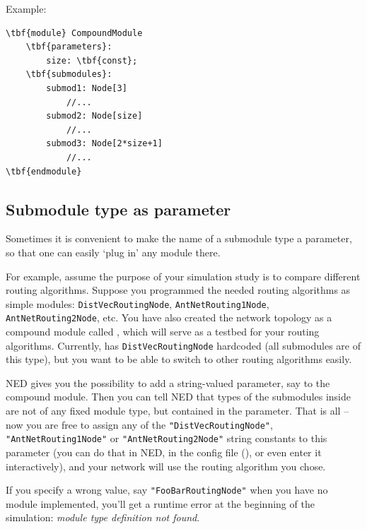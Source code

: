 Example:

\begin{Verbatim}[commandchars=\\\{\}]
\tbf{module} CompoundModule
    \tbf{parameters}:
        size: \tbf{const};
    \tbf{submodules}:
        submod1: Node[3]
            //...
        submod2: Node[size]
            //...
        submod3: Node[2*size+1]
            //...
\tbf{endmodule}
\end{Verbatim}



\subsection{Submodule type as parameter}
\label{sec:ch-ned-lang:like}

Sometimes it is convenient to make the name of a submodule type a parameter,
so that one can easily `plug in' any module there.

For example, assume the purpose of your simulation study is
to compare different routing algorithms. Suppose you programmed
the needed routing algorithms as simple modules: \texttt{DistVecRoutingNode},
\texttt{AntNetRouting1Node}, \texttt{AntNetRouting2Node}, etc.
You have also created the network topology as a compound module
called , which will serve as a testbed for your routing
algorithms. Currently,  has \texttt{DistVecRoutingNode}
hardcoded (all submodules are of this type), but you want
to be able to switch to other routing algorithms easily.

NED gives you the possibility to add a string-valued parameter,
say  to the  compound module.
Then you can tell NED that types of the submodules inside 
are not of any fixed module type, but contained in the 
parameter. That is all -- now you are free to assign any of
the \texttt{"DistVecRoutingNode"}, \texttt{"AntNetRouting1Node"} or
\texttt{"AntNetRouting2Node"} string constants to this parameter
(you can do that in NED, in the config file (),
or even enter it interactively),
and your network will use the routing algorithm you chose.

If you specify a wrong value, say \texttt{"FooBarRoutingNode"}
when you have no  module implemented,
you'll get a runtime error at the beginning of the simulation:
\textit{module type definition not found}.

